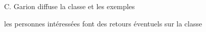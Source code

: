 \documentclass[fr,cr]{supaero-mins}
\begin{document}






\begin{actions}
\item C. Garion diffuse la classe et les exemples
\item les personnes intéressées font des retours éventuels sur la
  classe
\end{actions}
\end{document}

